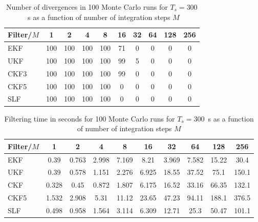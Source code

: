 \documentclass[../zhang_thesis.tex]{subfiles}
\begin{document}
\begin{table}[h]
\centering
\caption{Number of divergences in 100 Monte Carlo runs for $T_s=300$~s as a function of number of integration steps $M$}
\begin{tabular}{@{}l*{9}{c}@{}}
\toprule
Filter/$M$ & 1   & 2   & 4   & 8   & 16  & 32 & 64 & 128 & 256 \\
\midrule
EKF        & 100 & 100 & 100 & 100 & 71  & 0  & 0  & 0   & 0   \\
UKF        & 100 & 100 & 100 & 100 & 99  & 5  & 0  & 0   & 0   \\
CKF3       & 100 & 100 & 100 & 100 & 99  & 0  & 0  & 0   & 0   \\
CKF5       & 100 & 100 & 100 & 100 & 0   & 0  & 0  & 0   & 0   \\
SLF        & 100 & 100 & 100 & 100 & 0   & 0  & 0  & 0   & 0   \\
\bottomrule
\end{tabular}
\label{tab:div_300}
\end{table}

\begin{table}[h]
\centering
\caption{Filtering time in seconds for 100 Monte Carlo runs for $T_s=300$~s as a function of number of integration steps $M$}
\begin{tabular}{@{}lccccccccc@{}}
\toprule
Filter/$M$ & 1     & 2     & 4     & 8     & 16    & 32    & 64    & 128   & 256   \\ \midrule
EKF        & 0.39  & 0.763 & 2.998 & 7.169 & 8.21  & 3.969 & 7.582 & 15.22 & 30.4  \\
UKF        & 0.39  & 0.578 & 1.151 & 2.276 & 6.925 & 18.55 & 37.52 & 75.1  & 150.1 \\
CKF        & 0.328 & 0.45  & 0.872 & 1.807 & 6.175 & 16.52 & 33.16 & 66.35 & 132.1 \\
CKF5       & 1.532 & 2.908 & 5.31  & 11.12 & 23.65 & 47.23 & 94.11 & 188.1 & 376.5 \\
SLF        & 0.498 & 0.958 & 1.564 & 3.114 & 6.309 & 12.71 & 25.3  & 50.47 & 101.1 \\ \bottomrule
\end{tabular}
\label{tab:time_300}
\end{table}
\end{document}
